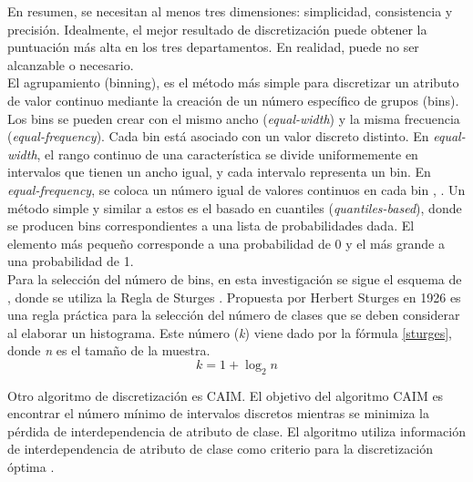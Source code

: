  En resumen, se necesitan al menos tres dimensiones: simplicidad, consistencia y precisión. Idealmente, el mejor resultado de discretización puede obtener la puntuación más alta en los tres departamentos. En realidad, puede no ser alcanzable o necesario. \\
 El agrupamiento (binning), es el método más simple para discretizar un atributo de valor continuo mediante la creación de un número específico de grupos (bins). Los bins se pueden crear con el mismo ancho (\textit{equal-width}) y la misma frecuencia (\textit{equal-frequency}). Cada bin está asociado con un valor discreto distinto. En \textit{equal-width}, el rango continuo de una característica se divide uniformemente en intervalos que tienen un ancho igual, y cada intervalo representa un bin. En \textit{equal-frequency}, se coloca un número igual de valores continuos en cada bin \citep{liu2002discretization}, \citep{yang2009discretization}. Un método simple y similar a estos es el basado en cuantiles (\textit{quantiles-based}), donde se producen bins correspondientes a una lista de probabilidades dada. El elemento más pequeño corresponde a una probabilidad de 0 y el más grande a una probabilidad de 1. \\
 Para la selección del número de bins, en esta investigación se sigue el esquema de \citep{coria2013mineria}, donde se utiliza la Regla de Sturges \citep{sturges1926choice}. Propuesta por Herbert Sturges en 1926 es una regla práctica para la selección del número de clases que se deben considerar al elaborar un histograma. Este número (\textit{k}) viene dado por la fórmula \ref{sturges}, donde \textit{n} es el tamaño de la muestra.
 \begin{equation} \label{sturges}
 	k = 1 + \log_{2} n
 \end{equation}
 
 Otro algoritmo de discretización es CAIM. El objetivo del algoritmo CAIM es encontrar el número mínimo de intervalos discretos mientras se minimiza la pérdida de interdependencia de atributo de clase. El algoritmo utiliza información de interdependencia de atributo de clase como criterio para la discretización óptima \citep{kurgan2004caim}.
 
